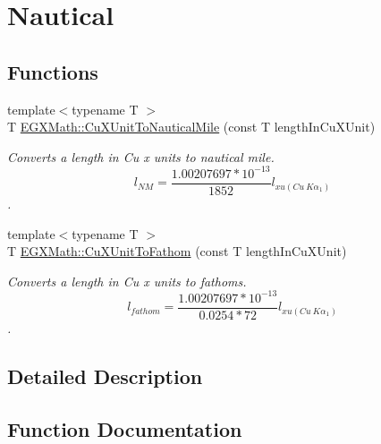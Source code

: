 \hypertarget{group___e_g_x_math-_conversions-_length_conversions-_non-_s_i-_cu_x_unit-_nautical}{}\section{Nautical}
\label{group___e_g_x_math-_conversions-_length_conversions-_non-_s_i-_cu_x_unit-_nautical}
\subsection*{Functions}
\begin{DoxyCompactItemize}
\item 
{\footnotesize template$<$typename T $>$ }\\T \mbox{\hyperlink{group___e_g_x_math-_conversions-_length_conversions-_non-_s_i-_cu_x_unit-_nautical_gaaa51a984890efeec739a702b982fad57}{E\+G\+X\+Math\+::\+Cu\+X\+Unit\+To\+Nautical\+Mile}} (const T length\+In\+Cu\+X\+Unit)
\begin{DoxyCompactList}\small\item\em Converts a length in Cu x units to nautical mile. \[ l_{NM}= \frac{1.00207697*10^{-13}}{1852} l_{xu(Cu\ K\alpha_1)} \]. \end{DoxyCompactList}\item 
{\footnotesize template$<$typename T $>$ }\\T \mbox{\hyperlink{group___e_g_x_math-_conversions-_length_conversions-_non-_s_i-_cu_x_unit-_nautical_ga7a3671693beab30a832008ca1294732f}{E\+G\+X\+Math\+::\+Cu\+X\+Unit\+To\+Fathom}} (const T length\+In\+Cu\+X\+Unit)
\begin{DoxyCompactList}\small\item\em Converts a length in Cu x units to fathoms. \[ l_{fathom}= \frac{1.00207697*10^{-13}}{0.0254 * 72} l_{xu(Cu\ K\alpha_1)} \]. \end{DoxyCompactList}\end{DoxyCompactItemize}


\subsection{Detailed Description}


\subsection{Function Documentation}
\mbox{\label{group___e_g_x_math-_conversions-_length_conversions-_non-_s_i-_cu_x_unit-_nautical_ga7a3671693beab30a832008ca1294732f}} 
